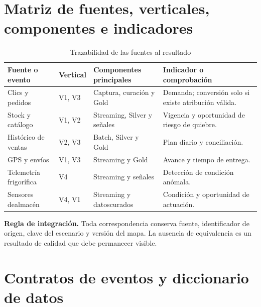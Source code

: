 \documentclass[11pt,a4paper]{article}
\newcommand{\Seccion}[1]{\FloatBarrier\Needspace{5\baselineskip}\section{#1}}
\begin{document}
\clearpage
\Seccion{Matriz de fuentes, verticales, componentes e indicadores}\label{anexo:matriz}
\begin{table}[H]
\caption{Trazabilidad de las fuentes al resultado}\label{tab:fuente-vertical}
\small\begin{tabularx}{\linewidth}{@{}P{.23\linewidth}P{.12\linewidth}YY@{}}\toprule
Fuente o evento & Vertical & Componentes principales & Indicador o comprobación\\\midrule
Clics y pedidos & V1, V3 & Captura, curación y Gold & Demanda; conversión solo si existe atribución válida.\\
Stock y catálogo & V1, V2 & Streaming, Silver y señales & Vigencia y oportunidad de riesgo de quiebre.\\
Histórico de ventas & V2, V3 & Batch, Silver y Gold & Plan diario y conciliación.\\
GPS y envíos & V1, V3 & Streaming y Gold & Avance y tiempo de entrega.\\
Telemetría frigorífica & V4 & Streaming y señales & Detección de condición anómala.\\
Sensores de\newline almacén & V4, V1 & Streaming y datos\newline curados & Condición y oportunidad de actuación.\\\bottomrule
\end{tabularx}
\end{table}
\textbf{Regla de integración.} Toda correspondencia conserva fuente, identificador de origen, clave del escenario y versión del mapa. La ausencia de equivalencia es un resultado de calidad que debe permanecer visible.

\clearpage
\Seccion{Contratos de eventos y diccionario de datos}\label{anexo:contratos}
\end{document}
